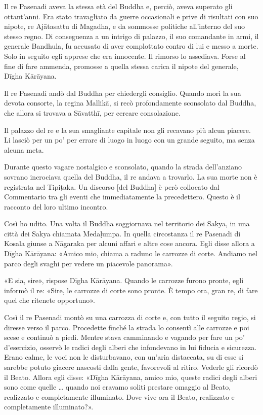 Il re Pasenadi aveva la stessa età del Buddha e,
perciò, aveva superato gli ottant’anni. Era stato travagliato da guerre
occasionali e prive di risultati con suo nipote, re Ajātasattu di
Magadha, e da sommosse politiche all’interno del suo stesso regno. Di
conseguenza a un intrigo di palazzo, il suo comandante in armi, il
generale Bandhula, fu accusato di aver complottato contro di lui e messo
a morte. Solo in seguito egli apprese che era innocente. Il rimorso lo
assediava. Forse al fine di fare ammenda, promosse a quella stessa
carica il nipote del generale, Dīgha Kārāyana.




 Il re Pasenadi andò dal Buddha per chiedergli
consiglio. Quando morì la sua devota consorte, la regina Mallikā, si
recò profondamente sconsolato dal Buddha, che allora si trovava a
Sāvatthī, per cercare consolazione.




 Il palazzo del re e la sua smagliante capitale non
gli recavano più alcun piacere. Li lasciò per un po’ per errare di luogo
in luogo con un grande seguito, ma senza alcuna meta.


 Durante questo vagare nostalgico e sconsolato, quando
la strada dell’anziano sovrano incrociava quella del Buddha, il re
andava a trovarlo. La sua morte non è registrata nel Tipiṭaka. Un
discorso [del Buddha] è però collocato dal Commentario tra gli eventi
che immediatamente la precedettero. Questo è il racconto del loro ultimo
incontro.


 Così ho udito. Una volta il Buddha soggiornava nel
territorio dei Sakya, in una città dei Sakya chiamata Medaḷumpa. In
quella circostanza il re Pasenadi di Kosala giunse a Nāgaraka per alcuni
affari e altre cose ancora. Egli disse allora a Dīgha Kārāyana: «Amico
mio, chiama a raduno le carrozze di corte. Andiamo nel parco degli
svaghi per vedere un piacevole panorama».


«E sia, sire», rispose Dīgha Kārāyana. Quando le carrozze furono pronte,
egli informò il re: «Sire, le carrozze di corte sono pronte. È tempo
ora, gran re, di fare quel che ritenete opportuno».


Così il re Pasenadi montò su una carrozza di corte e, con tutto il
seguito regio, si diresse verso il parco. Procedette finché la strada lo
consentì alle carrozze e poi scese e continuò a piedi. Mentre stava
camminando e vagando per fare un po’ d’esercizio, osservò le radici
degli alberi che infondevano in lui fiducia e sicurezza. Erano calme, le
voci non le disturbavano, con un’aria distaccata, su di esse si sarebbe
potuto giacere nascosti dalla gente, favorevoli al ritiro. Vederle gli
ricordò il Beato. Allora egli disse: «Dīgha Kārāyana, amico mio, queste
radici degli alberi sono come quelle … quando noi eravamo soliti
prestare omaggio al Beato, realizzato e completamente illuminato. Dove
vive ora il Beato, realizzato e completamente illuminato?».


